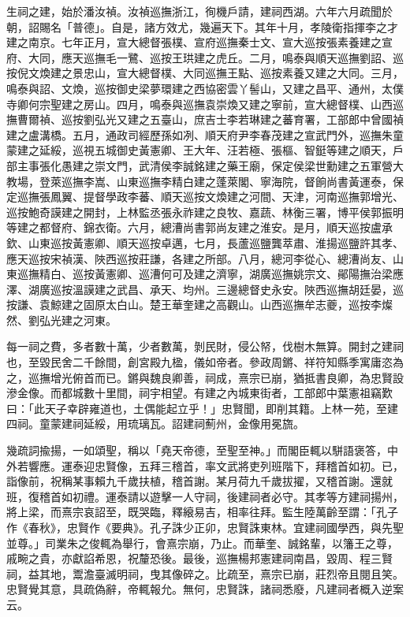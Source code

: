 \begin{pinyinscope}
生祠之建，始於潘汝禎。汝禎巡撫浙江，徇機戶請，建祠西湖。六年六月疏聞於朝，詔賜名「普德」。自是，諸方效尤，幾遍天下。其年十月，孝陵衛指揮李之才建之南京。七年正月，宣大總督張樸、宣府巡撫秦士文、宣大巡按張素養建之宣府、大同，應天巡撫毛一鷺、巡按王珙建之虎丘。二月，鳴泰與順天巡撫劉詔、巡按倪文煥建之景忠山，宣大總督樸、大同巡撫王點、巡按素養又建之大同。三月，鳴泰與詔、文煥，巡按御史梁夢環建之西協密雲丫髻山，又建之昌平、通州，太僕寺卿何宗聖建之房山。四月，鳴泰與巡撫袁崇煥又建之寧前，宣大總督樸、山西巡撫曹爾禎、巡按劉弘光又建之五臺山，庶吉士李若琳建之蕃育署，工部郎中曾國禎建之盧溝橋。五月，通政司經歷孫如冽、順天府尹李春茂建之宣武門外，巡撫朱童蒙建之延綏，巡視五城御史黃憲卿、王大年、汪若極、張樞、智鋌等建之順天，戶部主事張化愚建之崇文門，武清侯李誠銘建之藥王廟，保定侯梁世勳建之五軍營大教場，登萊巡撫李嵩、山東巡撫李精白建之蓬萊閣、寧海院，督餉尚書黃運泰，保定巡撫張鳳翼、提督學政李蕃、順天巡按文煥建之河間、天津，河南巡撫郭增光、巡按鮑奇謨建之開封，上林監丞張永祚建之良牧、嘉蔬、林衡三署，博平侯郭振明等建之都督府、錦衣衛。六月，總漕尚書郭尚友建之淮安。是月，順天巡按盧承欽、山東巡按黃憲卿、順天巡按卓邁，七月，長蘆巡鹽龔萃肅、淮揚巡鹽許其孝、應天巡按宋禎漢、陜西巡按莊謙，各建之所部。八月，總河李從心、總漕尚友、山東巡撫精白、巡按黃憲卿、巡漕何可及建之濟寧，湖廣巡撫姚宗文、鄖陽撫治梁應澤、湖廣巡按溫謨建之武昌、承天、均州。三邊總督史永安。陜西巡撫胡廷晏，巡按謙、袁鯨建之固原太白山。楚王華奎建之高觀山。山西巡撫牟志夔，巡按李燦然、劉弘光建之河東。

每一祠之費，多者數十萬，少者數萬，剝民財，侵公帑，伐樹木無算。開封之建祠也，至毀民舍二千餘間，創宮殿九楹，儀如帝者。參政周鏘、祥符知縣季寓庸恣為之，巡撫增光俯首而已。鏘與魏良卿善，祠成，熹宗已崩，猶抵書良卿，為忠賢設滲金像。而都城數十里間，祠宇相望。有建之內城東街者，工部郎中葉憲祖竊歎曰：「此天子幸辟雍道也，土偶能起立乎！」忠賢聞，即削其籍。上林一苑，至建四祠。童蒙建祠延綏，用琉璃瓦。詔建祠薊州，金像用冕旒。

幾疏詞揄揚，一如頌聖，稱以「堯天帝德，至聖至神。」而閣臣輒以駢語褒答，中外若響應。運泰迎忠賢像，五拜三稽首，率文武將吏列班階下，拜稽首如初。已，詣像前，祝稱某事賴九千歲扶植，稽首謝。某月荷九千歲拔擢，又稽首謝。還就班，復稽首如初禮。運泰請以遊擊一人守祠，後建祠者必守。其孝等方建祠揚州，將上梁，而熹宗哀詔至，既哭臨，釋縗易吉，相率往拜。監生陸萬齡至謂：「孔子作《春秋》，忠賢作《要典》。孔子誅少正卯，忠賢誅東林。宜建祠國學西，與先聖並尊。」司業朱之俊輒為舉行，會熹宗崩，乃止。而華奎、誠銘輩，以籓王之尊，戚畹之貴，亦獻諂希恩，祝釐恐後。最後，巡撫楊邦憲建祠南昌，毀周、程三賢祠，益其地，鬻澹臺滅明祠，曳其像碎之。比疏至，熹宗已崩，莊烈帝且閱且笑。忠賢覺其意，具疏偽辭，帝輒報允。無何，忠賢誅，諸祠悉廢，凡建祠者概入逆案云。


\end{pinyinscope}

